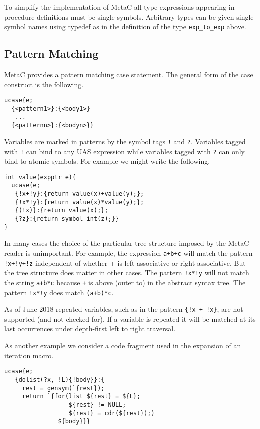 \documentclass{article}
\begin{document}
To simplify the implementation of MetaC all type expressions appearing in procedure definitions must be single symbols. Arbitrary types can be given single symbol names
using typedef as in the definition of the type {\tt exp\_to\_exp} above.

\subsection{Pattern Matching}

MetaC provides a pattern matching case statement.
The general form of the case construct is the following.

\begin{verbatim}
ucase{e;
  {<pattern1>}:{<body1>}
   ...
  {<patternn>}:{<bodyn>}}
\end{verbatim}

Variables are marked in patterns by the symbol tags {\tt !} and {\tt ?}.  Variables tagged with {\tt !} can bind to any UAS expression
while variables tagged with {\tt ?} can only bind to atomic symbols.
For example we might write the following.

\begin{verbatim}
int value(expptr e){
  ucase{e;
   {!x+!y}:{return value(x)+value(y);};
   {!x*!y}:{return value(x)*value(y);};
   {(!x)}:{return value(x);};
   {?z}:{return symbol_int(z);}}
}
\end{verbatim}

In many cases the choice of the particular tree structure imposed by the MetaC reader is unimportant.  For example, the expression {\tt a+b+c} will match the pattern
{\tt !x+!y+!z} independent of whether + is left associative or right associative.  But the tree structure does matter in other cases.  The pattern {\tt !x*!y}
will not match the string {\tt a+b*c} because {\tt +} is above (outer to) {\tt *} in the abstract syntax tree. The pattern {\tt !x*!y} does match {\tt (a+b)*c}.

As of June 2018 repeated variables, such as in the pattern {\tt \{!x + !x\}}, are not supported (and not checked for).
If a variable is repeated it will be matched at its last occurrences under depth-first left to right traversal.

As another example we consider a code fragment used in the expansion of an iteration macro.

\begin{verbatim}
ucase{e;
   {dolist(?x, !L){!body}}:{
     rest = gensym(`{rest});
     return `{for(list ${rest} = ${L};
                  ${rest} != NULL;
                  ${rest} = cdr(${rest});)
               ${body}}}
\end{verbatim}
\end{document}
